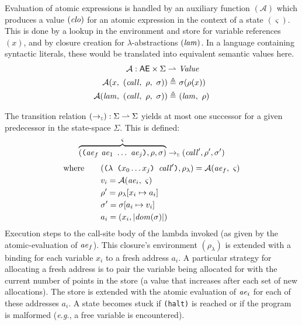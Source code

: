 Evaluation of atomic expressions is handled by an auxiliary function $(\mathcal{A})$ which produces a value $(\mathit{clo})$
for an atomic expression in the context of a state $(\varsigma)$.
%
This is done by a lookup in the environment and store for variable references $(x)$, and by closure creation for $\lambda$-abstractions $(\mathit{lam})$.
%
In a language containing syntactic literals, these would be translated into equivalent semantic values here.
%
\begin{align*}
  \mathcal{A} : \mathsf{AE} \times \Sigma \rightharpoonup&\ \var{Value} 
  \\
  \mathcal{A}(x,\ (\var{call},\ \rho,\ \sigma)) \defas&\ \sigma(\rho(x)) 
  \\
  \mathcal{A}(\var{lam},\ (\var{call},\ \rho,\ \sigma)) \defas&\ (\var{lam},\ \rho) 
\end{align*}


The transition relation $(\cTo) : \Sigma \rightharpoonup \Sigma$ yields at most one successor for a given predecessor in the state-space $\Sigma$.
%
This is defined:
%
\begin{align*} 
  \overbrace{(\ttlp \var{ae}_f\ \var{ae}_1\ \ldots\ \var{ae}_j \ttrp, \rho, \sigma)}^{\varsigma} 
  \cTo 
  (\var{call}', \rho', \sigma')
\end{align*}
\vspace{-0.5cm}
\begin{align*}
  \textrm{where} \ \ \ \ \ \ & (\texttt{($\lambda$\ (}x_0 \ldots x_j\texttt{)\ }\mathit{call}'\texttt{)}, \rho_\lambda) = \mathcal{A}(\mathit{ae}_f,\ \varsigma) 
  \\
  & v_i = \mathcal{A}(\mathit{ae}_i,\ \varsigma)  
  \\
  & \rho' = \rho_\lambda [ x_i \mapsto a_i ]
  \\
  & \sigma' = \sigma [ a_i \mapsto v_i ]
  \\
  & a_i = (x_i, \vert \mathit{dom}(\sigma) \vert)
\end{align*}
%
Execution steps to the call-site body of the lambda invoked (as given by the atomic-evaluation of $\mathit{ae}_f$).
%
This closure's environment $(\rho_\lambda)$ is extended with a binding for each variable $x_i$ to a fresh address $a_i$.
%
A particular strategy for allocating a fresh address is to pair the variable being allocated for with the current number of points in the store (a value that increases after each set of new allocations).
%
The store is extended with the atomic evaluation of $\mathit{ae}_i$ for each of these addresses $a_i$.
%
A state becomes stuck if \texttt{(halt)} is reached or if the program is malformed (\textit{e.g.}, a free variable is encountered).



